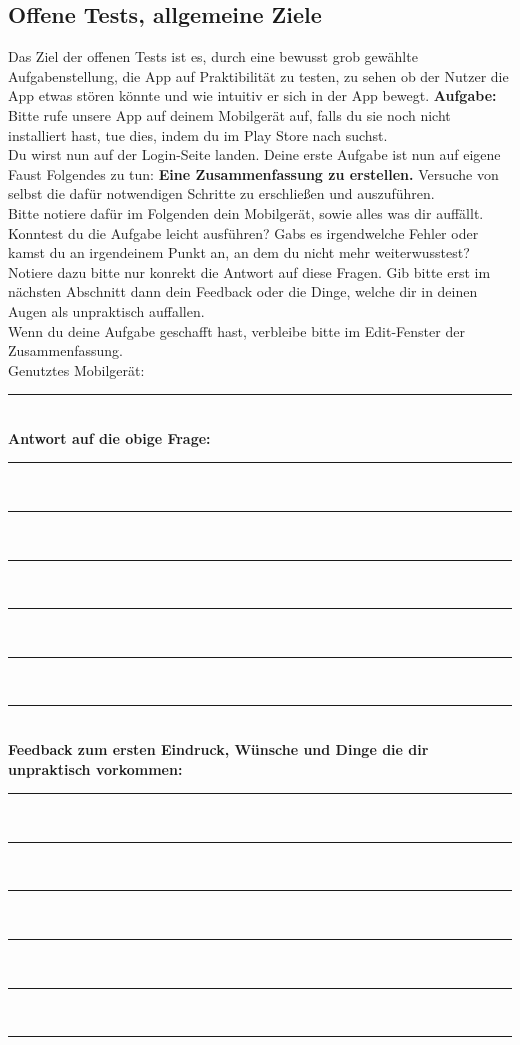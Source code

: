 \subsection{Offene Tests, allgemeine Ziele}
Das Ziel der offenen Tests ist es, durch eine bewusst grob gewählte Aufgabenstellung, die App auf Praktibilität zu testen, zu sehen ob der Nutzer die App etwas stören könnte und wie intuitiv er sich in der App bewegt.\newline
\textbf{Aufgabe:}\newline
Bitte rufe unsere App auf deinem Mobilgerät auf, falls du sie noch nicht installiert hast, tue dies, indem du im Play Store nach  suchst.\\
Du wirst nun auf der Login-Seite landen. Deine erste Aufgabe ist nun auf eigene Faust Folgendes zu tun: \textbf{Eine Zusammenfassung zu erstellen.} Versuche von selbst die dafür notwendigen Schritte zu erschließen und auszuführen.\\
Bitte notiere dafür im Folgenden dein Mobilgerät, sowie alles was dir auffällt. Konntest du die Aufgabe leicht ausführen? Gabs es irgendwelche Fehler oder kamst du an irgendeinem Punkt an, an dem du nicht mehr weiterwusstest?\\
Notiere dazu bitte nur konrekt die Antwort auf diese Fragen. Gib bitte erst im nächsten Abschnitt dann dein Feedback oder die Dinge, welche dir in deinen Augen als unpraktisch auffallen.\\
Wenn du deine Aufgabe geschafft hast, verbleibe bitte im Edit-Fenster der Zusammenfassung.\\
Genutztes Mobilgerät: \rule{0.25\textwidth}{0.4pt}\\
\textbf{Antwort auf die obige Frage:}\\
\noindent\rule{\textwidth}{0.4pt}\\
\noindent\rule{\textwidth}{0.4pt}\\
\noindent\rule{\textwidth}{0.4pt}\\
\noindent\rule{\textwidth}{0.4pt}\\
\noindent\rule{\textwidth}{0.4pt}\\
\noindent\rule{\textwidth}{0.4pt}\\
\textbf{Feedback zum ersten Eindruck, Wünsche und Dinge die dir unpraktisch vorkommen:}
\noindent\rule{\textwidth}{0.4pt}\\
\noindent\rule{\textwidth}{0.4pt}\\
\noindent\rule{\textwidth}{0.4pt}\\
\noindent\rule{\textwidth}{0.4pt}\\
\noindent\rule{\textwidth}{0.4pt}\\
\noindent\rule{\textwidth}{0.4pt}\\


